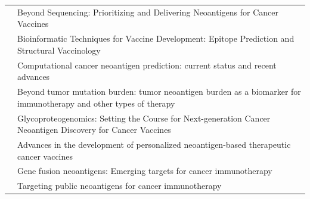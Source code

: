 \begin{table}[H]
\begin{tabular}{p{3cm}p{10cm}}
		\cite{roesler2022beyond}              & Beyond Sequencing: Prioritizing and Delivering Neoantigens for Cancer Vaccines                                                            \\
		\cite{mccaffrey2022bioinformatic}     & Bioinformatic Techniques for Vaccine Development: Epitope Prediction and Structural Vaccinology                                           \\
		\cite{fotakis2021computational}       & Computational cancer neoantigen prediction: current status and recent advances                                                            \\
		\cite{wang2021beyond}                 & Beyond tumor mutation burden: tumor neoantigen burden as a biomarker for immunotherapy and other types of therapy                         \\
		\cite{ferreira2021glycoproteogenomics}& Glycoproteogenomics: Setting the Course for Next-generation Cancer Neoantigen Discovery for Cancer Vaccines                               \\
		\cite{blass2021advances}              & Advances in the development of personalized neoantigen-based therapeutic cancer vaccines                                                  \\
		\cite{wang2021gene}                   & Gene fusion neoantigens: Emerging targets for cancer immunotherapy                                                                        \\
		\cite{pearlman2021targeting}          & Targeting public neoantigens for cancer immunotherapy                                                                                     \\	                                                                    
	\end{tabular}
\end{table}


